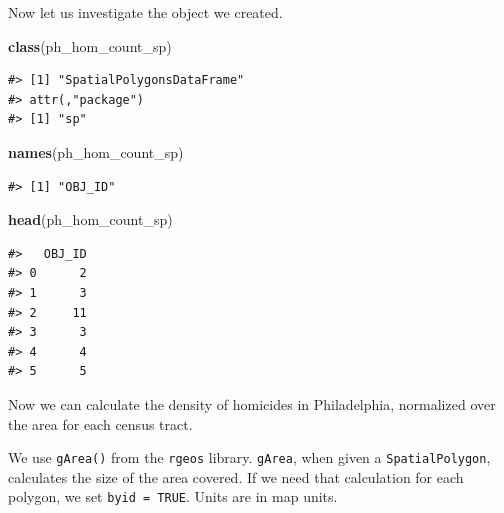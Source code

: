\documentclass[]{book}
\newenvironment{Shaded}{\begin{snugshade}}{\end{snugshade}}
\newcommand{\KeywordTok}[1]{\textcolor[rgb]{0.13,0.29,0.53}{\textbf{#1}}}
\newcommand{\DataTypeTok}[1]{\textcolor[rgb]{0.13,0.29,0.53}{#1}}
\newcommand{\FloatTok}[1]{\textcolor[rgb]{0.00,0.00,0.81}{#1}}
\newcommand{\StringTok}[1]{\textcolor[rgb]{0.31,0.60,0.02}{#1}}
\newcommand{\CommentTok}[1]{\textcolor[rgb]{0.56,0.35,0.01}{\textit{#1}}}
\newcommand{\OtherTok}[1]{\textcolor[rgb]{0.56,0.35,0.01}{#1}}
\newcommand{\OperatorTok}[1]{\textcolor[rgb]{0.81,0.36,0.00}{\textbf{#1}}}
\newcommand{\NormalTok}[1]{#1}
\theoremstyle{definition}
\theoremstyle{definition}
\theoremstyle{definition}
\theoremstyle{remark}
\begin{document}
Now let us investigate the object we created.

\begin{Shaded}
\begin{Highlighting}[]
\KeywordTok{class}\NormalTok{(ph_hom_count_sp)}
\end{Highlighting}
\end{Shaded}

\begin{verbatim}
#> [1] "SpatialPolygonsDataFrame"
#> attr(,"package")
#> [1] "sp"
\end{verbatim}

\begin{Shaded}
\begin{Highlighting}[]
\KeywordTok{names}\NormalTok{(ph_hom_count_sp)}
\end{Highlighting}
\end{Shaded}

\begin{verbatim}
#> [1] "OBJ_ID"
\end{verbatim}

\begin{Shaded}
\begin{Highlighting}[]
\KeywordTok{head}\NormalTok{(ph_hom_count_sp)}
\end{Highlighting}
\end{Shaded}

\begin{verbatim}
#>   OBJ_ID
#> 0      2
#> 1      3
#> 2     11
#> 3      3
#> 4      4
#> 5      5
\end{verbatim}

Now we can calculate the density of homicides in Philadelphia,
normalized over the area for each census tract.

We use \texttt{gArea()} from the \texttt{rgeos} library. \texttt{gArea},
when given a \texttt{SpatialPolygon}, calculates the size of the area
covered. If we need that calculation for each polygon, we set
\texttt{byid\ =\ TRUE}. Units are in map units.

\begin{Shaded}
\end{Shaded}
\end{document}
